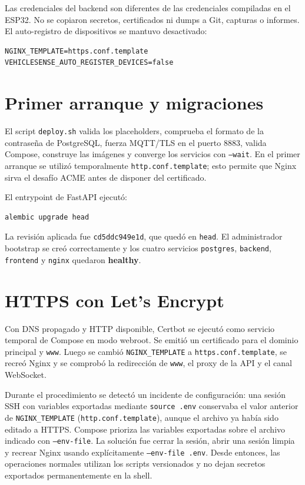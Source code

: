 \documentclass[12pt,a4paper,oneside]{report}
\newcommand{\status}[1]{\textcolor{codegreen}{\textbf{#1}}}
\newcommand{\code}[1]{\texttt{\small #1}}
\begin{document}
Las credenciales del backend son diferentes de las credenciales compiladas en el
ESP32. No se copiaron secretos, certificados ni dumps a Git, capturas o informes.
El auto-registro de dispositivos se mantuvo desactivado:

\begin{lstlisting}
NGINX_TEMPLATE=https.conf.template
VEHICLESENSE_AUTO_REGISTER_DEVICES=false
\end{lstlisting}

\section{Primer arranque y migraciones}

El script \code{deploy.sh} valida los placeholders, comprueba el formato de la
contraseña de PostgreSQL, fuerza MQTT/TLS en el puerto 8883, valida Compose,
construye las imágenes y converge los servicios con \code{--wait}. En el primer
arranque se utilizó temporalmente \code{http.conf.template}; esto permite que
Nginx sirva el desafío ACME antes de disponer del certificado.

El entrypoint de FastAPI ejecutó:

\begin{lstlisting}
alembic upgrade head
\end{lstlisting}

La revisión aplicada fue \code{cd5ddc949e1d}, que quedó en \code{head}. El
administrador bootstrap se creó correctamente y los cuatro servicios
\code{postgres}, \code{backend}, \code{frontend} y \code{nginx} quedaron
\status{healthy}.

\section{HTTPS con Let's Encrypt}

Con DNS propagado y HTTP disponible, Certbot se ejecutó como servicio temporal de
Compose en modo webroot. Se emitió un certificado para el dominio principal y
\code{www}. Luego se cambió \code{NGINX\_TEMPLATE} a
\code{https.conf.template}, se recreó Nginx y se comprobó la redirección de
\code{www}, el proxy de la API y el canal WebSocket.

Durante el procedimiento se detectó un incidente de configuración: una sesión SSH
con variables exportadas mediante \code{source .env} conservaba el valor anterior
de \code{NGINX\_TEMPLATE} (\code{http.conf.template}), aunque el archivo ya había
sido editado a HTTPS. Compose prioriza las variables exportadas sobre el archivo
indicado con \code{--env-file}. La solución fue cerrar la sesión, abrir una sesión
limpia y recrear Nginx usando explícitamente \code{--env-file .env}. Desde entonces, las
operaciones normales utilizan los scripts versionados y no dejan secretos
exportados permanentemente en la shell.
\end{document}
